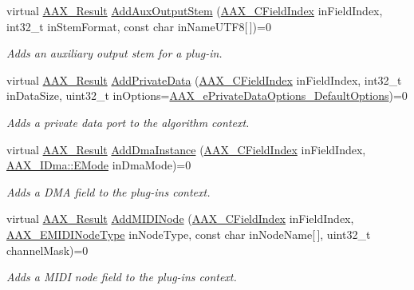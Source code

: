 \begin{DoxyCompactItemize}
virtual \hyperlink{a00149_a4d8f69a697df7f70c3a8e9b8ee130d2f}{A\+A\+X\+\_\+\+Result} \hyperlink{a00050_a9207476186fa1b1fb361dd36b242e567}{Add\+Aux\+Output\+Stem} (\hyperlink{a00149_ae807f8986143820cfb5d6da32165c9c7}{A\+A\+X\+\_\+\+C\+Field\+Index} in\+Field\+Index, int32\+\_\+t in\+Stem\+Format, const char in\+Name\+U\+T\+F8\mbox{[}$\,$\mbox{]})=0
\begin{DoxyCompactList}\small\item\em Adds an auxiliary output stem for a plug-\/in. \end{DoxyCompactList}\item 
virtual \hyperlink{a00149_a4d8f69a697df7f70c3a8e9b8ee130d2f}{A\+A\+X\+\_\+\+Result} \hyperlink{a00050_aaec556edd58fea7d4b6c404f7ce1f95c}{Add\+Private\+Data} (\hyperlink{a00149_ae807f8986143820cfb5d6da32165c9c7}{A\+A\+X\+\_\+\+C\+Field\+Index} in\+Field\+Index, int32\+\_\+t in\+Data\+Size, uint32\+\_\+t in\+Options=\hyperlink{a00206_a9f1ef2cb64daf30eaf145dfbb8cd0d00a59458e9bf18919c51e59eb2fd6e84a9a}{A\+A\+X\+\_\+e\+Private\+Data\+Options\+\_\+\+Default\+Options})=0
\begin{DoxyCompactList}\small\item\em Adds a private data port to the algorithm context. \end{DoxyCompactList}\item 
virtual \hyperlink{a00149_a4d8f69a697df7f70c3a8e9b8ee130d2f}{A\+A\+X\+\_\+\+Result} \hyperlink{a00050_aed4d0748c59e03fe18b79b924f7dbaab}{Add\+Dma\+Instance} (\hyperlink{a00149_ae807f8986143820cfb5d6da32165c9c7}{A\+A\+X\+\_\+\+C\+Field\+Index} in\+Field\+Index, \hyperlink{a00095_af8d0f19f2896dd6dbd126b919b24e39b}{A\+A\+X\+\_\+\+I\+Dma\+::\+E\+Mode} in\+Dma\+Mode)=0
\begin{DoxyCompactList}\small\item\em Adds a D\+M\+A field to the plug-\/in\textquotesingle{}s context. \end{DoxyCompactList}\item 
virtual \hyperlink{a00149_a4d8f69a697df7f70c3a8e9b8ee130d2f}{A\+A\+X\+\_\+\+Result} \hyperlink{a00050_a72b9908f5bbef7d5fb3d259b76861a82}{Add\+M\+I\+D\+I\+Node} (\hyperlink{a00149_ae807f8986143820cfb5d6da32165c9c7}{A\+A\+X\+\_\+\+C\+Field\+Index} in\+Field\+Index, \hyperlink{a00206_a5e1dffce35d05990dbbad651702678e4}{A\+A\+X\+\_\+\+E\+M\+I\+D\+I\+Node\+Type} in\+Node\+Type, const char in\+Node\+Name\mbox{[}$\,$\mbox{]}, uint32\+\_\+t channel\+Mask)=0
\begin{DoxyCompactList}\small\item\em Adds a M\+I\+D\+I node field to the plug-\/in\textquotesingle{}s context. \end{DoxyCompactList}\item 

\end{DoxyCompactItemize}
